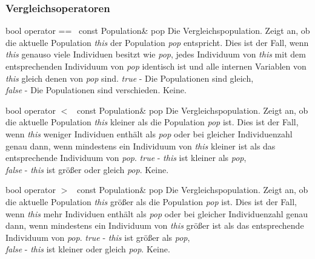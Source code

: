 \documentclass{report}
\begin{document}
\newpage

\subsubsection{Vergleichsoperatoren}

\setConstInstance
\printMethodWithOneParam
{bool}
{operator ==\ }
{const Population\&}
{pop}
{Die Vergleichspopulation.}
{Zeigt an, ob die aktuelle Population {\em this} der
 Population {\em pop} entspricht. Dies ist der Fall, wenn 
 {\em this} genauso viele Individuen besitzt wie {\em pop},
 jedes Individuum von {\em this} mit dem entsprechenden Individuum
 von {\em pop} identisch ist und alle internen Variablen von {\em this} 
 gleich denen von {\em pop} sind.}
{{\em true} - Die Populationen sind gleich,\\
 {\em false} - Die Populationen sind verschieden.}
{Keine.}

\vspace{4ex}

\setConstInstance
\printMethodWithOneParam
{bool}
{operator $<$\ }
{const Population\&}
{pop}
{Die Vergleichspopulation.}
{Zeigt an, ob die aktuelle Population {\em this} kleiner als die
 Population {\em pop} ist. Dies ist der Fall, wenn 
 {\em this} weniger Individuen enth\"alt als {\em pop} oder bei
 gleicher Individuenzahl genau dann, wenn mindestens ein Individuum
 von {\em this} kleiner ist als das entsprechende Individuum von
 {\em pop}.}
{{\em true} - {\em this} ist kleiner als {\em pop},\\
 {\em false} - {\em this} ist gr\"o{\ss}er oder gleich {\em pop}.}
{Keine.}

\vspace{4ex}

\setConstInstance
\printMethodWithOneParam
{bool}
{operator $>$\ }
{const Population\&}
{pop}
{Die Vergleichspopulation.}
{Zeigt an, ob die aktuelle Population {\em this} gr\"o{\ss}er als die
 Population {\em pop} ist. Dies ist der Fall, wenn 
 {\em this} mehr Individuen enth\"alt als {\em pop} oder bei
 gleicher Individuenzahl genau dann, wenn mindestens ein Individuum
 von {\em this} gr\"o{\ss}er ist als das entsprechende Individuum von
 {\em pop}.}
{{\em true} - {\em this} ist gr\"o{\ss}er als {\em pop},\\
 {\em false} - {\em this} ist kleiner oder gleich {\em pop}.}
{Keine.}
\end{document}
